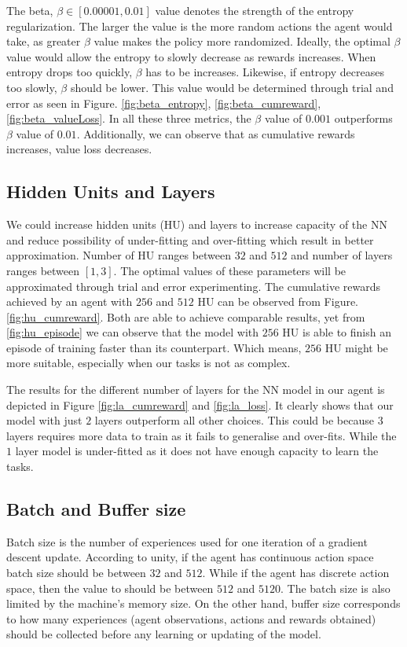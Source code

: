 The beta, $\beta \in [0.00001, 0.01]$ value denotes the strength of the entropy regularization. 
The larger the value is the more random actions the agent would take, as greater $\beta$ value makes the policy more randomized. Ideally, the optimal $\beta$ value would allow the entropy to slowly decrease as rewards increases. When entropy drops too quickly, $\beta$ has to be increases. Likewise, if entropy decreases too slowly, $\beta$ should be lower. This value would be determined through trial and error as seen in Figure. \ref{fig:beta_entropy}, \ref{fig:beta_cumreward}, \ref{fig:beta_valueLoss}. In all these three metrics, the $\beta$ value of $0.001$ outperforms $\beta$ value of $0.01$. Additionally, we can observe that as cumulative rewards increases, value loss decreases.



\subsection{Hidden Units and Layers}

We could increase hidden units (HU) and layers to increase capacity of the NN and reduce possibility of under-fitting and over-fitting which result in better approximation. Number of HU ranges between $32$ and $512$ and number of layers ranges between $[1,3]$. The optimal values of these parameters will be approximated through trial and error experimenting. The cumulative rewards achieved by an agent with $256$ and $512$ HU can be observed from Figure. \ref{fig:hu_cumreward}. Both are able to achieve comparable results, yet from \ref{fig:hu_episode} we can observe that the model with $256$ HU is able to finish an episode of training faster than its counterpart. Which means, $256$ HU might be more suitable, especially when our tasks is not as complex.


The results for the different number of layers for the NN model in our agent is depicted in Figure \ref{fig:la_cumreward} and \ref{fig:la_loss}. It clearly shows that our model with just $2$ layers outperform all other choices. This could be because $3$ layers requires more data to train as it fails to generalise and over-fits. While the $1$ layer model is under-fitted as it does not have enough capacity to learn the tasks.

\subsection{Batch and Buffer size}

Batch size is the number of experiences used for one iteration of a gradient descent update. According to unity, if the agent has continuous action space batch size should be between $32$ and $512$. While if the agent has discrete action space, then the value to should be between $512$ and $5120$. The batch size is also limited by the machine's memory size. On the other hand, buffer size corresponds to how many experiences (agent observations, actions and rewards obtained) should be collected before any learning or updating of the model. 

